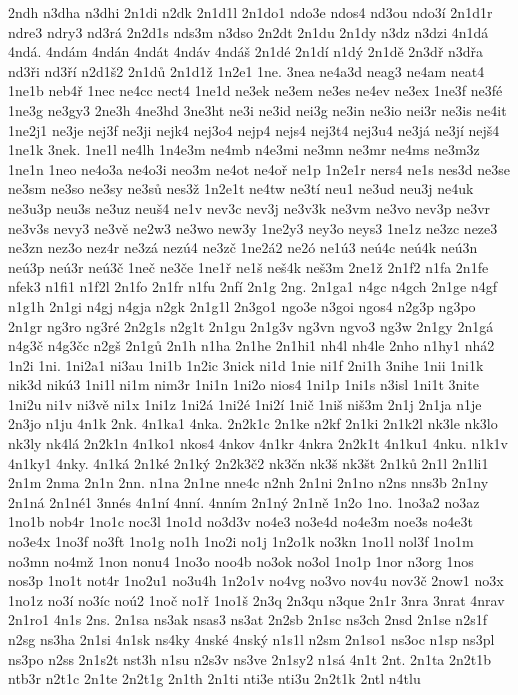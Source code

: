 2ndh
n3dha
n3dhi
2n1di
n2dk
2n1d1l
2n1do1
ndo3e
ndos4
nd3ou
ndo3í
2n1d1r
ndre3
ndry3
nd3rá
2n2d1s
nds3m
n3dso
2n2dt
2n1du
2n1dy
n3dz
n3dzi
4n1dá
4ndá.
4ndám
4ndán
4ndát
4ndáv
4ndáš
2n1dé
2n1dí
n1dý
2n1dě
2n3dř
n3dřa
nd3ři
nd3ří
n2d1š2
2n1dů
2n1d1ž
1n2e1
1ne.
3nea
ne4a3d
neag3
ne4am
neat4
1ne1b
neb4ř
1nec
ne4cc
nect4
1ne1d
ne3ek
ne3em
ne3es
ne4ev
ne3ex
1ne3f
ne3fé
1ne3g
ne3gy3
2ne3h
4ne3hd
3ne3ht
ne3i
ne3id
nei3g
ne3in
ne3io
nei3r
ne3is
ne4it
1ne2j1
ne3je
nej3f
ne3ji
nejk4
nej3o4
nejp4
nejs4
nej3t4
nej3u4
ne3já
ne3jí
nejš4
1ne1k
3nek.
1ne1l
ne4lh
1n4e3m
ne4mb
n4e3mi
ne3mn
ne3mr
ne4ms
ne3m3z
1ne1n
1neo
ne4o3a
ne4o3i
neo3m
ne4ot
ne4oř
ne1p
1n2e1r
ners4
ne1s
nes3d
ne3se
ne3sm
ne3so
ne3sy
ne3sů
nes3ž
1n2e1t
ne4tw
ne3tí
neu1
ne3ud
neu3j
ne4uk
ne3u3p
neu3s
ne3uz
neuš4
ne1v
nev3c
nev3j
ne3v3k
ne3vm
ne3vo
nev3p
ne3vr
ne3v3s
nevy3
ne3vě
ne2w3
ne3wo
new3y
1ne2y3
ney3o
neys3
1ne1z
ne3zc
neze3
ne3zn
nez3o
nez4r
ne3zá
nezú4
ne3zč
1ne2á2
ne2ó
ne1ú3
neú4c
neú4k
neú3n
neú3p
neú3r
neú3č
1neč
ne3če
1ne1ř
ne1š
neš4k
neš3m
2ne1ž
2n1f2
n1fa
2n1fe
nfek3
n1fi1
n1f2l
2n1fo
2n1fr
n1fu
2nfí
2n1g
2ng.
2n1ga1
n4gc
n4gch
2n1ge
n4gf
n1g1h
2n1gi
n4gj
n4gja
n2gk
2n1g1l
2n3go1
ngo3e
n3goi
ngos4
n2g3p
ng3po
2n1gr
ng3ro
ng3ré
2n2g1s
n2g1t
2n1gu
2n1g3v
ng3vn
ngvo3
ng3w
2n1gy
2n1gá
n4g3č
n4g3čc
n2gš
2n1gů
2n1h
n1ha
2n1he
2n1hi1
nh4l
nh4le
2nho
n1hy1
nhá2
1n2i
1ni.
1ni2a1
ni3au
1ni1b
1n2ic
3nick
ni1d
1nie
ni1f
2ni1h
3nihe
1nii
1ni1k
nik3d
nikú3
1ni1l
ni1m
nim3r
1ni1n
1ni2o
nios4
1ni1p
1ni1s
n3isl
1ni1t
3nite
1ni2u
ni1v
ni3vě
ni1x
1ni1z
1ni2á
1ni2é
1ni2í
1nič
1niš
niš3m
2n1j
2n1ja
n1je
2n3jo
n1ju
4n1k
2nk.
4n1ka1
4nka.
2n2k1c
2n1ke
n2kf
2n1ki
2n1k2l
nk3le
nk3lo
nk3ly
nk4lá
2n2k1n
4n1ko1
nkos4
4nkov
4n1kr
4nkra
2n2k1t
4n1ku1
4nku.
n1k1v
4n1ky1
4nky.
4n1ká
2n1ké
2n1ký
2n2k3č2
nk3čn
nk3š
nk3št
2n1ků
2n1l
2n1li1
2n1m
2nma
2n1n
2nn.
n1na
2n1ne
nne4c
n2nh
2n1ni
2n1no
n2ns
nns3b
2n1ny
2n1ná
2n1né1
3nnés
4n1ní
4nní.
4nním
2n1ný
2n1ně
1n2o
1no.
1no3a2
no3az
1no1b
nob4r
1no1c
noc3l
1no1d
no3d3v
no4e3
no3e4d
no4e3m
noe3s
no4e3t
no3e4x
1no3f
no3ft
1no1g
no1h
1no2i
no1j
1n2o1k
no3kn
1no1l
nol3f
1no1m
no3mn
no4mž
1non
nonu4
1no3o
noo4b
no3ok
no3ol
1no1p
1nor
n3org
1nos
nos3p
1no1t
not4r
1no2u1
no3u4h
1n2o1v
no4vg
no3vo
nov4u
nov3č
2now1
no3x
1no1z
no3í
no3íc
noú2
1noč
no1ř
1no1š
2n3q
2n3qu
n3que
2n1r
3nra
3nrat
4nrav
2n1ro1
4n1s
2ns.
2n1sa
ns3ak
nsas3
ns3at
2n2sb
2n1sc
ns3ch
2nsd
2n1se
n2s1f
n2sg
ns3ha
2n1si
4n1sk
ns4ky
4nské
4nský
n1s1l
n2sm
2n1so1
ns3oc
n1sp
ns3pl
ns3po
n2ss
2n1s2t
nst3h
n1su
n2s3v
ns3ve
2n1sy2
n1sá
4n1t
2nt.
2n1ta
2n2t1b
ntb3r
n2t1c
2n1te
2n2t1g
2n1th
2n1ti
nti3e
nti3u
2n2t1k
2ntl
n4tlu
